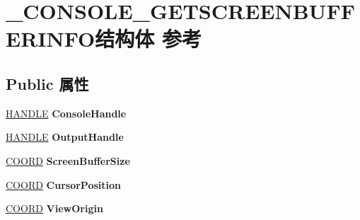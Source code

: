 \hypertarget{struct___c_o_n_s_o_l_e___g_e_t_s_c_r_e_e_n_b_u_f_f_e_r_i_n_f_o}{}\section{\+\_\+\+C\+O\+N\+S\+O\+L\+E\+\_\+\+G\+E\+T\+S\+C\+R\+E\+E\+N\+B\+U\+F\+F\+E\+R\+I\+N\+F\+O结构体 参考}
\label{struct___c_o_n_s_o_l_e___g_e_t_s_c_r_e_e_n_b_u_f_f_e_r_i_n_f_o}
\subsection*{Public 属性}
\begin{DoxyCompactItemize}
\item 
\mbox{\label{struct___c_o_n_s_o_l_e___g_e_t_s_c_r_e_e_n_b_u_f_f_e_r_i_n_f_o_a62d3f1ce16e40f935d0ad11868661be7}} 
\hyperlink{interfacevoid}{H\+A\+N\+D\+LE} {\bfseries Console\+Handle}
\item 
\mbox{\label{struct___c_o_n_s_o_l_e___g_e_t_s_c_r_e_e_n_b_u_f_f_e_r_i_n_f_o_ab0455712fa7981a5d34fe6874bff3694}} 
\hyperlink{interfacevoid}{H\+A\+N\+D\+LE} {\bfseries Output\+Handle}
\item 
\mbox{\label{struct___c_o_n_s_o_l_e___g_e_t_s_c_r_e_e_n_b_u_f_f_e_r_i_n_f_o_a499079caf40100f5722cf9d37790a0ac}} 
\hyperlink{struct___c_o_o_r_d}{C\+O\+O\+RD} {\bfseries Screen\+Buffer\+Size}
\item 
\mbox{\label{struct___c_o_n_s_o_l_e___g_e_t_s_c_r_e_e_n_b_u_f_f_e_r_i_n_f_o_a147b9312fef91413506bcc80bbbd95b2}} 
\hyperlink{struct___c_o_o_r_d}{C\+O\+O\+RD} {\bfseries Cursor\+Position}
\item 
\mbox{\label{struct___c_o_n_s_o_l_e___g_e_t_s_c_r_e_e_n_b_u_f_f_e_r_i_n_f_o_ae67aad93a947fc6fe4dc5452f2b47ac2}} 
\hyperlink{struct___c_o_o_r_d}{C\+O\+O\+RD} {\bfseries View\+Origin}
\item 

\end{DoxyCompactItemize}
